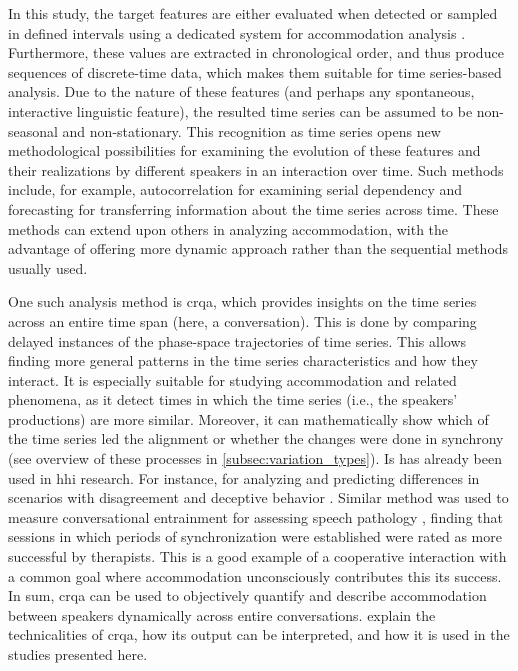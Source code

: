In this study, the target features are either evaluated when detected or sampled in defined intervals using a dedicated system for accommodation analysis \citep[][and see details in \cref{sec:dataset_calls}]{Raveh2018Specom}.
Furthermore, these values are extracted in chronological order, and thus produce sequences of discrete-time data, which makes them suitable for time series-based analysis.
Due to the nature of these features (and perhaps any spontaneous, interactive linguistic feature), the resulted time series can be assumed to be non-seasonal and non-stationary.
This recognition as time series opens new methodological possibilities for examining the evolution of these features and their realizations by different speakers in an interaction over time.
Such methods include, for example, autocorrelation for examining serial dependency and forecasting for transferring information about the time series across time.
These methods can extend upon others in analyzing accommodation, with the advantage of offering more dynamic approach rather than the sequential methods usually used.

One such analysis method is \acf{crqa}, which provides insights on the time series across an entire time span (here, a conversation).
This is done by comparing delayed instances of the phase-space trajectories of time series.
This allows finding more general patterns in the time series characteristics and how they interact.
It is especially suitable for studying accommodation and related phenomena, as it detect times in which the time series (i.e., the speakers' productions) are more similar.
Moreover, it can mathematically show which of the time series led the alignment or whether the changes were done in synchrony (see overview of these processes in \cref{subsec:variation_types}).
Is has already been used in \ac{hhi} research.
For instance, for analyzing and predicting differences in scenarios with disagreement and deceptive behavior \citep{Duran2017conversing}.
Similar method was used to measure conversational entrainment for assessing speech pathology \citep{Borrie2019syncing}, finding that sessions in which periods of synchronization were established were rated as more successful by therapists.
This is a good example of a cooperative interaction with a common goal where accommodation unconsciously contributes this its success.
In sum, \ac{crqa} can be used to objectively quantify and describe accommodation between speakers dynamically across entire conversations.
 explain the technicalities of \ac{crqa}, how its output can be interpreted, and how it is used in the studies presented here.

